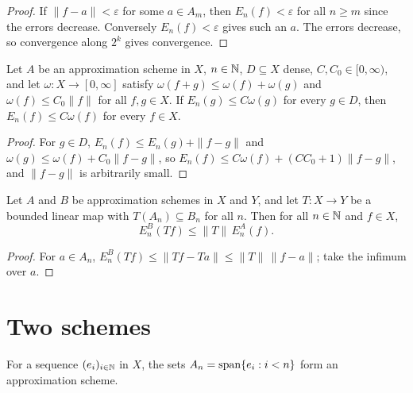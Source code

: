 \begin{proof}
\leanok
If $\|f - a\| < \varepsilon$ for some $a \in A_m$, then $E_n(f) < \varepsilon$ for all
$n \geq m$ since the errors decrease. Conversely $E_n(f) < \varepsilon$ gives such an $a$.
The errors decrease, so convergence along $2^k$ gives convergence.
\end{proof}

\begin{lemma}
\label{lem:error-dense}
\leanok
{}
Let $A$ be an approximation scheme in $X$, $n \in \mathbb{N}$, $D \subseteq X$ dense,
$C, C_0 \in [0, \infty)$, and let $\omega : X \to [0, \infty]$ satisfy
$\omega(f + g) \leq \omega(f) + \omega(g)$ and $\omega(f) \leq C_0 \|f\|$ for all
$f, g \in X$. If $E_n(g) \leq C \omega(g)$ for every $g \in D$, then $E_n(f) \leq C \omega(f)$
for every $f \in X$.
\end{lemma}

\begin{proof}
\leanok
For $g \in D$, $E_n(f) \leq E_n(g) + \|f - g\|$ and $\omega(g) \leq \omega(f) + C_0 \|f - g\|$,
so $E_n(f) \leq C \omega(f) + (C C_0 + 1) \|f - g\|$, and $\|f - g\|$ is arbitrarily small.
\end{proof}

\begin{lemma}
\label{lem:error-map}
\leanok
{}
Let $A$ and $B$ be approximation schemes in $X$ and $Y$, and let $T : X \to Y$ be a bounded
linear map with $T(A_n) \subseteq B_n$ for all $n$. Then for all $n \in \mathbb{N}$ and $f \in X$,
\[
  E^B_n(T f) \leq \|T\| \, E^A_n(f).
\]
\end{lemma}

\begin{proof}
\leanok
For $a \in A_n$, $E^B_n(Tf) \leq \|Tf - Ta\| \leq \|T\| \, \|f - a\|$; take the infimum
over $a$.
\end{proof}

\section{Two schemes}

\begin{definition}
\label{def:ofspan}
\leanok
{}
For a sequence $(e_i)_{i \in \mathbb{N}}$ in $X$, the sets $A_n = \operatorname{span}\{e_i : i < n\}$ form an
approximation scheme.
\end{definition}

